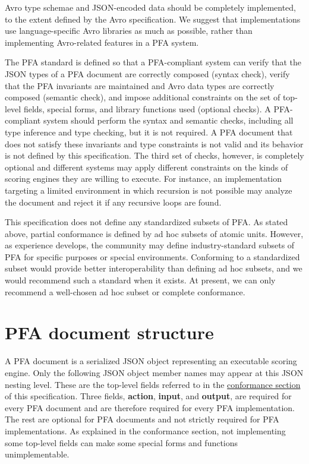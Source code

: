 \documentclass{article}
\newcommand{\PFAc}{\ttfamily\bfseries}
\theoremstyle{definition}
\begin{document}
Avro type schemae and JSON-encoded data should be completely implemented, to the extent defined by the Avro specification.  We suggest that implementations use language-specific Avro libraries as much as possible, rather than implementing Avro-related features in a PFA system.

The PFA standard is defined so that a PFA-compliant system can verify that the JSON types of a PFA document are correctly composed (syntax check), verify that the PFA invariants are maintained and Avro data types are correctly composed (semantic check), and impose additional constraints on the set of top-level fields, special forms, and library functions used (optional checks).  A PFA-compliant system should perform the syntax and semantic checks, including all type inference and type checking, but it is not required.  A PFA document that does not satisfy these invariants and type constraints is not valid and its behavior is not defined by this specification.  The third set of checks, however, is completely optional and different systems may apply different constraints on the kinds of scoring engines they are willing to execute.  For instance, an implementation targeting a limited environment in which recursion is not possible may analyze the document and reject it if any recursive loops are found.

This specification does not define any standardized subsets of PFA.  As stated above, partial conformance is defined by ad hoc subsets of atomic units.  However, as experience develops, the community may define industry-standard subsets of PFA for specific purposes or special environments.  Conforming to a standardized subset would provide better interoperability than defining ad hoc subsets, and we would recommend such a standard when it exists.  At present, we can only recommend a well-chosen ad hoc subset or complete conformance.

\pagebreak

\section{PFA document structure}

A PFA document is a serialized JSON object representing an executable scoring engine.  Only the following JSON object member names may appear at this JSON nesting level.  These are the top-level fields referred to in the \hyperlink{hsec:conformance}{conformance section} of this specification.  Three fields, {\PFAc action}, {\PFAc input}, and {\PFAc output}, are required for every PFA document and are therefore required for every PFA implementation.  The rest are optional for PFA documents and not strictly required for PFA implementations.  As explained in the conformance section, not implementing some top-level fields can make some special forms and functions unimplementable.
\end{document}
